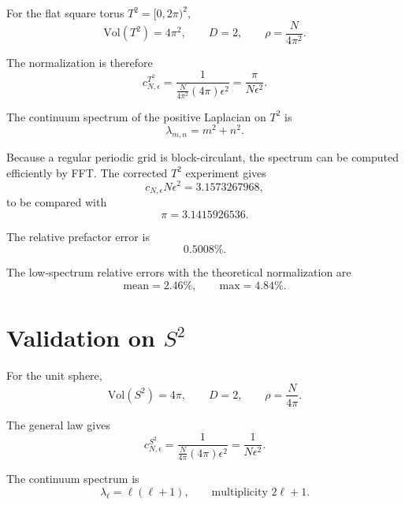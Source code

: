 \documentclass[11pt,a4paper]{article}
\newcommand{\Vol}{\mathrm{Vol}}
\begin{document}
For the flat square torus \(T^2=[0,2\pi)^2\),
\begin{equation}
\Vol(T^2)=4\pi^2,\qquad D=2,\qquad \rho=\frac{N}{4\pi^2}.
\end{equation}

The normalization is therefore
\begin{equation}
c_{N,\epsilon}^{T^2}
=
\frac{1}
{
\frac{N}{4\pi^2}(4\pi)\epsilon^2
}
=
\boxed{
\frac{\pi}{N\epsilon^2}.
}
\end{equation}

The continuum spectrum of the positive Laplacian on \(T^2\) is
\begin{equation}
\lambda_{m,n}=m^2+n^2.
\end{equation}

Because a regular periodic grid is block-circulant, the spectrum can be
computed efficiently by FFT. The corrected \(T^2\) experiment gives
\begin{equation}
c_{N,\epsilon}N\epsilon^2=3.1573267968,
\end{equation}
to be compared with
\begin{equation}
\pi=3.1415926536.
\end{equation}

The relative prefactor error is
\begin{equation}
0.5008\%.
\end{equation}

The low-spectrum relative errors with the theoretical normalization are
\begin{equation}
\text{mean}=2.46\%,
\qquad
\text{max}=4.84\%.
\end{equation}

\section{Validation on \(S^2\)}

For the unit sphere,
\begin{equation}
\Vol(S^2)=4\pi,\qquad D=2,\qquad \rho=\frac{N}{4\pi}.
\end{equation}

The general law gives
\begin{equation}
c_{N,\epsilon}^{S^2}
=
\frac{1}
{
\frac{N}{4\pi}(4\pi)\epsilon^2
}
=
\boxed{
\frac{1}{N\epsilon^2}.
}
\end{equation}

The continuum spectrum is
\begin{equation}
\lambda_\ell=\ell(\ell+1),
\qquad
\text{multiplicity }2\ell+1.
\end{equation}
\end{document}
